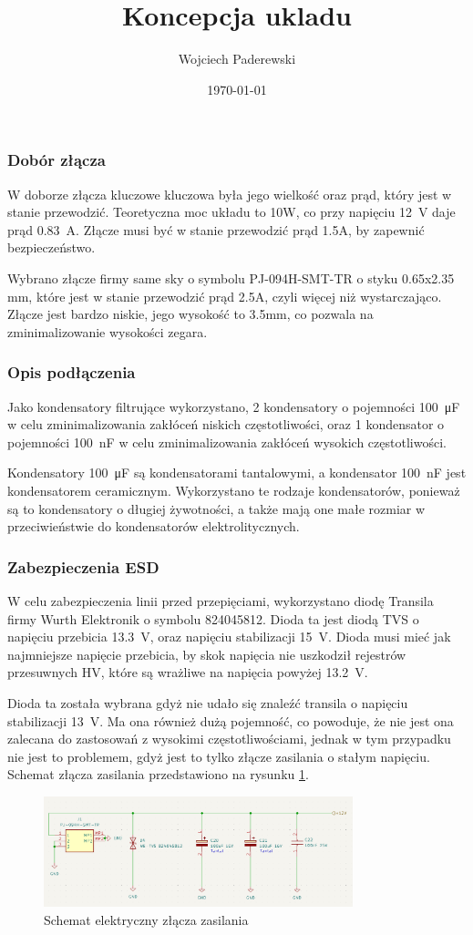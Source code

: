\documentclass[../../main.tex]{subfiles}
\author{Wojciech Paderewski}
\date{\today}
\title{Koncepcja ukladu}
\begin{document}
\subsubsection{Dobór złącza}
W doborze złącza kluczowe kluczowa była jego wielkość oraz prąd, który jest w stanie przewodzić. Teoretyczna moc układu to 10W,
co przy napięciu \SI{12}{\volt} daje prąd \SI{0.83}{\ampere}. Złącze musi być w stanie przewodzić prąd 1.5A, by zapewnić bezpieczeństwo. 

Wybrano złącze firmy same sky o symbolu PJ-094H-SMT-TR o styku 0.65x2.35 mm, które jest w stanie przewodzić prąd 2.5A, czyli więcej niż wystarczająco.
Złącze jest bardzo niskie, jego wysokość to 3.5mm, co pozwala na zminimalizowanie wysokości zegara.
\subsubsection{Opis podłączenia}
Jako kondensatory filtrujące wykorzystano, 2 kondensatory o 
pojemności \SI{100}{\micro\farad}  w celu zminimalizowania zakłóceń niskich częstotliwości, oraz 1 kondensator o pojemności \SI{100}{\nano\farad} w celu zminimalizowania zakłóceń wysokich częstotliwości.

Kondensatory \SI{100}{\micro\farad}  są kondensatorami tantalowymi, a kondensator \SI{100}{\nano\farad} jest kondensatorem ceramicznym. Wykorzystano te rodzaje kondensatorów, 
ponieważ są to kondensatory o długiej żywotności, a także mają one małe rozmiar w przeciwieństwie do kondensatorów elektrolitycznych.
\subsubsection{Zabezpieczenia ESD}
W celu zabezpieczenia linii przed przepięciami, wykorzystano diodę Transila firmy Wurth Elektronik o symbolu 824045812. Dioda ta jest diodą TVS o napięciu przebicia \SI{13.3}{\volt},
oraz napięciu stabilizacji \SI{15}{\volt}. Dioda musi mieć jak najmniejsze napięcie przebicia, by skok napięcia nie uszkodził rejestrów przesuwnych HV, które są wrażliwe na napięcia powyżej \SI{13.2}{\volt}.

Dioda ta została wybrana gdyż nie udało się znaleźć transila o napięciu stabilizacji \SI{13}{\volt}. Ma ona również dużą pojemność, co powoduje, że nie jest ona zalecana do 
zastosowań z wysokimi częstotliwościami, jednak w tym przypadku nie jest to problemem, gdyż jest to tylko złącze zasilania o stałym napięciu. 
Schemat złącza zasilania przedstawiono na rysunku \ref{fig:DcPlug_schemat}.
\begin{figure}[H]
    \centering
    \includegraphics[width=0.8\textwidth]{DcPlug_schemat.png}
    \caption{Schemat elektryczny złącza zasilania}
    \label{fig:DcPlug_schemat}
\end{figure}
\end{document}
